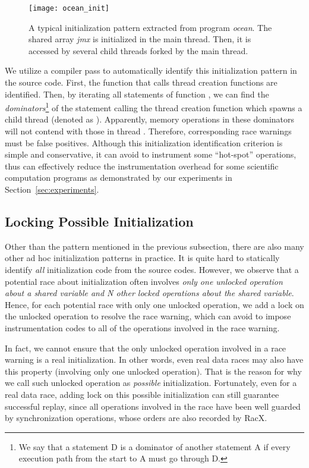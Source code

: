 \documentclass[10pt,onecolumn,letterpaper]{article}
\begin{document}
\begin{figure} [htbg]
\centering
\texttt{[image: ocean\_init]}
\caption{A typical initialization pattern extracted from program
\emph{ocean}. The shared array \emph{jmx} is initialized in the main
thread. Then, it is accessed by several child threads forked by the
main thread.}\label{fig:oinit}
\end{figure}

We utilize a compiler pass to automatically identify this
initialization pattern in the source code. First, the function 
that calls thread creation functions are identified. Then, by
iterating all statements of function , we can find the
\emph{dominators}\footnote{We say that a statement D is a dominator
of another statement A if every execution path from the start to A
must go through D.} of the statement calling the thread creation
function which spawns a child thread (denoted as ). Apparently,
memory operations in these dominators will not contend with those in
thread . Therefore, corresponding race warnings must be false
positives. Although this initialization identification criterion is
simple and conservative, it can avoid to instrument some
``hot-spot'' operations, thus can effectively reduce the
instrumentation overhead for some scientific computation programs as
demonstrated by our experiments in Section~\ref{sec:experiments}.

\subsection{Locking Possible Initialization}
Other than the pattern mentioned in the previous subsection, there
are also many other ad hoc initialization patterns in practice. It
is quite hard to statically identify \emph{all} initialization code
from the source codes. However, we observe that a potential race
about initialization often involves \emph{only one unlocked
operation about a shared variable and N other locked operations
about the shared variable}. Hence, for each potential race with only
one unlocked operation, we add a lock on the unlocked operation to
resolve the race warning, which can avoid to impose instrumentation
codes to all of the  operations involved in the race warning.

In fact, we cannot ensure that the only unlocked operation involved
in a race warning is a real initialization. In other words, even
real data races may also have this property (involving only one
unlocked operation). That is the reason for why we call such
unlocked operation as \emph{possible} initialization. Fortunately,
even for a real data race, adding lock on this possible
initialization can still guarantee successful replay, since all
operations involved in the race have been well guarded by
synchronization operations, whose orders are also recorded by RacX.
\end{document}
